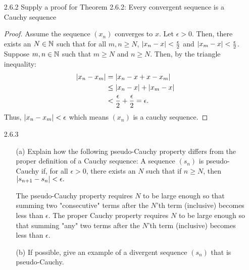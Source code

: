 \documentclass[12pt,letterpaper]{article}
\begin{document}
\begin{itemize}[leftmargin=!,labelindent=5pt]
\begin{proof}
            First, choose $k=1$ and pick $a_{n_1}$ to add to the subsequence such that $a_{n_1} \in (s - \frac{1}{1}, s]$.

            Next, choose $k>1$ and pick $a_{n_k}$ to add to the subsequence such that $a_{n_k} \in (s - \frac{1}{k}, s]$.

            Repeating the 2nd step while always choosing $k$ such that it is strictly greater than the previous choice will yield in the desired subsequence.
            This is because it is guaranteed there are always infinitely many terms left to pick from the sequence and add to the subsequence by the way $S$ is defined.
            Thus, this method creates a subsequence of $(a_n)$ which converges to $s$ as the $\frac{1}{k}$ term becomes smaller, that is $\abs{s - a_{n_k}} < \frac{1}{k}$.

        \end{proof}
    \item [2.6.2] Supply a proof for Theorem 2.6.2: Every convergent sequence is a Cauchy sequence
        \begin{proof}
            Assume the sequence $(x_n)$ converges to $x$.
            Let $\epsilon > 0$.
            Then, there exists an $N \in \mathbb{N}$ such that for all $m,n \geq N$, $\abs{x_n - x} < \frac{\epsilon}{2}$ and $\abs{x_m - x} < \frac{\epsilon}{2}$.
            Suppose $m, n \in \mathbb{N}$ such that $m \geq N$ and $n \geq N$.
            Then, by the triangle inequality:
            \begin{align*}
                \abs{x_n - x_m} &= \abs{x_n - x + x - x_m}\\
                &\leq \abs{x_n - x} + \abs{x_m - x}\\
                &< \frac{\epsilon}{2} + \frac{\epsilon}{2} = \epsilon.
            \end{align*}
            Thus, $\abs{x_n - x_m} < \epsilon$ which means $(x_n)$ is a cauchy sequence.
        \end{proof}
    \item [2.6.3]
        \begin{itemize}
            \item [(a)] Explain how the following pseudo-Cauchy property differs from the proper definition of a Cauchy sequence: A sequence $(s_n)$ is pseudo-Cauchy if, for all $\epsilon > 0$, there exists an $N$ such that if $n \geq N$, then $\abs{s_{n+1} - s_n} < \epsilon.$

                The pseudo-Cauchy property requires $N$ to be large enough so that summing two "consecutive" terms after the $N$'th term (inclusive) becomes less than $\epsilon$.
                The proper Cauchy property requires $N$ to be large enough so that summing "any" two terms after the $N$'th term (inclusive) becomes less than $\epsilon$.
            \item [(b)] If possible, give an example of a divergent sequence $(s_n)$ that is pseudo-Cauchy.
            

\end{itemize}
\end{itemize}
\end{document}
